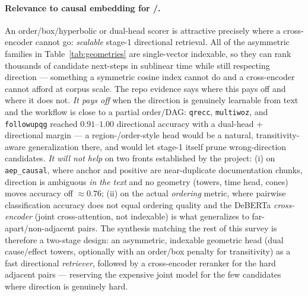 \paragraph{Relevance to causal embedding for \aep{}/\ajo{}.}
An order/box/hyperbolic or dual-head scorer is attractive precisely where a
cross-encoder cannot go: \emph{scalable} stage-1 directional retrieval. All of
the asymmetric families in Table~\ref{tab:geometries} are single-vector
indexable, so they can rank thousands of candidate next-steps in sublinear time
while still respecting direction --- something a symmetric cosine index cannot
do and a cross-encoder cannot afford at corpus scale. The repo evidence says
where this pays off and where it does not. \emph{It pays off} when the
direction is genuinely learnable from text and the workflow is close to a
partial order/DAG: \texttt{qrecc}, \texttt{multiwoz}, and \texttt{followupqg}
reached $0.91$--$1.00$ directional accuracy with a dual-head + directional
margin --- a region-/order-style head would be a natural, transitivity-aware
generalization there, and would let stage-1 itself prune wrong-direction
candidates. \emph{It will not help} on two fronts established by the project:
(i) on \texttt{aep\_causal}, where anchor and positive are near-duplicate
documentation chunks, direction is ambiguous \emph{in the text} and no geometry
(towers, time head, cones) moves accuracy off $\approx0.76$; (ii) on the actual
\emph{ordering} metric, where pairwise classification accuracy does not equal
ordering quality and the DeBERTa \emph{cross-encoder} (joint cross-attention,
not indexable) is what generalizes to far-apart/non-adjacent pairs. The
synthesis matching the rest of this survey is therefore a two-stage design: an
asymmetric, indexable geometric head (dual cause/effect towers, optionally with
an order/box penalty for transitivity) as a fast directional \emph{retriever},
followed by a cross-encoder reranker for the hard adjacent pairs --- reserving
the expensive joint model for the few candidates where direction is genuinely
hard.
